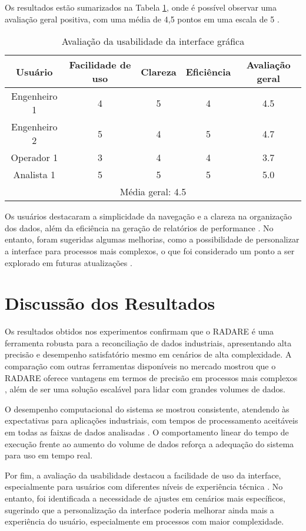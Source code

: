 Os resultados estão sumarizados na Tabela \ref{Tab:Usabilidade}, onde é possível observar uma avaliação geral positiva, com uma média de 4,5 pontos em uma escala de 5 \cite{usabilityMetrics}.

\begin{table}[htbp]
    \centering
    \caption{Avaliação da usabilidade da interface gráfica}
    \label{Tab:Usabilidade}
    \begin{tabular}{|c|c|c|c|c|}
        \hline
        Usuário & Facilidade de uso & Clareza & Eficiência & Avaliação geral \\ \hline
        Engenheiro 1 & 4 & 5 & 4 & 4.5 \\ \hline
        Engenheiro 2 & 5 & 4 & 5 & 4.7 \\ \hline
        Operador 1 & 3 & 4 & 4 & 3.7 \\ \hline
        Analista 1 & 5 & 5 & 5 & 5.0 \\ \hline
        \multicolumn{5}{|c|}{Média geral: 4.5} \\ \hline
    \end{tabular}
\end{table}

Os usuários destacaram a simplicidade da navegação e a clareza na organização dos dados, além da eficiência na geração de relatórios de performance \cite{performanceReporting}. No entanto, foram sugeridas algumas melhorias, como a possibilidade de personalizar a interface para processos mais complexos, o que foi considerado um ponto a ser explorado em futuras atualizações \cite{customizationForIndustry}.

\section{Discussão dos Resultados}
\label{Sec:DiscussaoResultados}

Os resultados obtidos nos experimentos confirmam que o RADARE é uma ferramenta robusta para a reconciliação de dados industriais, apresentando alta precisão e desempenho satisfatório mesmo em cenários de alta complexidade. A comparação com outras ferramentas disponíveis no mercado mostrou que o RADARE oferece vantagens em termos de precisão em processos mais complexos \cite{comparisonToTools}, além de ser uma solução escalável para lidar com grandes volumes de dados.

O desempenho computacional do sistema se mostrou consistente, atendendo às expectativas para aplicações industriais, com tempos de processamento aceitáveis em todas as faixas de dados analisadas \cite{computationalPerformanceIndustry}. O comportamento linear do tempo de execução frente ao aumento do volume de dados reforça a adequação do sistema para uso em tempo real.

Por fim, a avaliação da usabilidade destacou a facilidade de uso da interface, especialmente para usuários com diferentes níveis de experiência técnica \cite{userExperienceIndustry}. No entanto, foi identificada a necessidade de ajustes em cenários mais específicos, sugerindo que a personalização da interface poderia melhorar ainda mais a experiência do usuário, especialmente em processos com maior complexidade.
